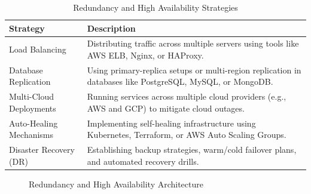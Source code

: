 \begin{table}[h]
    \centering
    \begin{tabular}{|l|p{10cm}|}
        \hline
        \textbf{Strategy}       & \textbf{Description}                                                                                      \\
        \hline
        Load Balancing          & Distributing traffic across multiple servers using tools like AWS ELB, Nginx, or HAProxy.                 \\
        \hline
        Database Replication    & Using primary-replica setups or multi-region replication in databases like PostgreSQL, MySQL, or MongoDB. \\
        \hline
        Multi-Cloud Deployments & Running services across multiple cloud providers (e.g., AWS and GCP) to mitigate cloud outages.           \\
        \hline
        Auto-Healing Mechanisms & Implementing self-healing infrastructure using Kubernetes, Terraform, or AWS Auto Scaling Groups.         \\
        \hline
        Disaster Recovery (DR)  & Establishing backup strategies, warm/cold failover plans, and automated recovery drills.                  \\
        \hline
    \end{tabular}
    \caption{Redundancy and High Availability Strategies}
    \label{tab:redundancy-strategies}
\end{table}

\begin{figure}[H]
    \centering
    \caption{Redundancy and High Availability Architecture}
    \label{fig:redundancy-architecture}
\end{figure}

